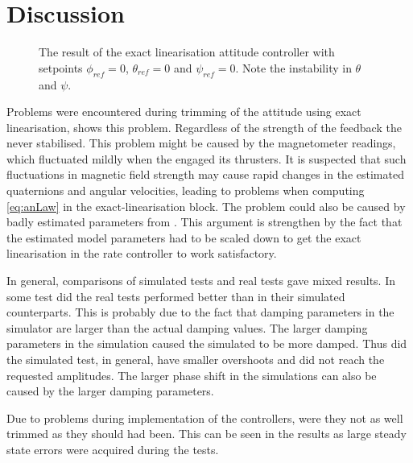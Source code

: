 \section{Discussion}
\begin{figure}
\centering
  \qquad
  \qquad
  \caption{\label{fig:ExactLinAttitude}%
  The result of the exact linearisation attitude controller with setpoints $\phi_{ref}=0$, $\theta_{ref}=0$ and $\psi_{ref}=0$. Note the instability in $\theta$ and $\psi$.}
\end{figure}

Problems were encountered during trimming of the attitude \abbrPID using exact linearisation,  shows this problem. Regardless of the strength of the feedback the \abbrROV never stabilised. This problem might be caused by the magnetometer readings, which fluctuated mildly when the \abbrROV  engaged its thrusters. It is suspected that such fluctuations in magnetic field strength may cause rapid changes in the estimated quaternions and angular velocities, leading to problems when computing \eqref{eq:anLaw} in the exact-linearisation block. The problem could also be caused by badly estimated parameters from . This argument is strengthen by the fact that the estimated model parameters had to be scaled down to get the exact linearisation in the rate controller to work satisfactory. 


In general, comparisons of simulated tests and real tests gave mixed results. In some test did the real tests performed better than in their simulated counterparts. This is probably due to the fact that damping parameters in the simulator are larger than the actual damping values. The larger damping parameters in the simulation caused the simulated \abbrROV to be more damped. Thus did the simulated test, in general, have smaller overshoots and did not reach the requested amplitudes. The larger phase shift in the simulations can also be caused by the larger damping parameters.  

Due to problems during implementation of the controllers, were they not as well trimmed as they should had been. This can be seen in the results as large steady state errors were acquired during the tests. 
